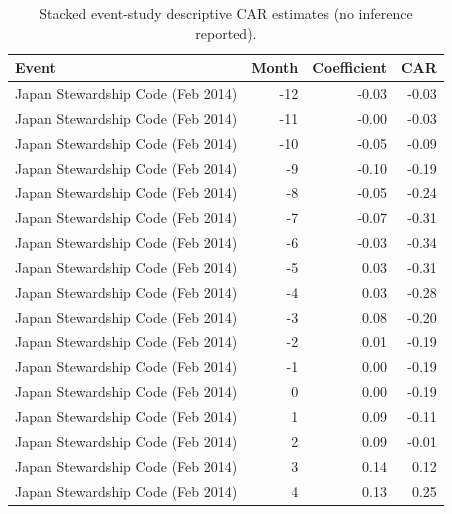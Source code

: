 \begin{table}
\caption{Stacked event-study descriptive CAR estimates (no inference reported).}
\label{tab:event_study_coefs}
\begin{tabular}{lrrr}
\toprule
Event & Month & Coefficient & CAR \\
\midrule
Japan Stewardship Code (Feb 2014) & -12 & -0.03 & -0.03 \\
Japan Stewardship Code (Feb 2014) & -11 & -0.00 & -0.03 \\
Japan Stewardship Code (Feb 2014) & -10 & -0.05 & -0.09 \\
Japan Stewardship Code (Feb 2014) & -9 & -0.10 & -0.19 \\
Japan Stewardship Code (Feb 2014) & -8 & -0.05 & -0.24 \\
Japan Stewardship Code (Feb 2014) & -7 & -0.07 & -0.31 \\
Japan Stewardship Code (Feb 2014) & -6 & -0.03 & -0.34 \\
Japan Stewardship Code (Feb 2014) & -5 & 0.03 & -0.31 \\
Japan Stewardship Code (Feb 2014) & -4 & 0.03 & -0.28 \\
Japan Stewardship Code (Feb 2014) & -3 & 0.08 & -0.20 \\
Japan Stewardship Code (Feb 2014) & -2 & 0.01 & -0.19 \\
Japan Stewardship Code (Feb 2014) & -1 & 0.00 & -0.19 \\
Japan Stewardship Code (Feb 2014) & 0 & 0.00 & -0.19 \\
Japan Stewardship Code (Feb 2014) & 1 & 0.09 & -0.11 \\
Japan Stewardship Code (Feb 2014) & 2 & 0.09 & -0.01 \\
Japan Stewardship Code (Feb 2014) & 3 & 0.14 & 0.12 \\
Japan Stewardship Code (Feb 2014) & 4 & 0.13 & 0.25 \\

\end{tabular}
\end{table}
